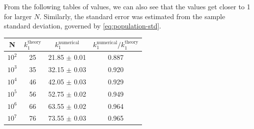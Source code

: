 From the following tables of values, we can also see that the values get closer to 1 for larger $N$. Similarly, the standard error was estimated from the sample standard deviation, governed by \autoref{eq:population-std}. 

\begin{center}
\begin{tabular}{ ||c | c | c | c ||}
\hline
N & $k_1^{\text{theory}}$ & $k_1^{\text{numerical}}$ & $k_1^{\text{numerical}} / k_1^{\text{theory}} $\\ 
\hline
$10^2$ & 25    & 21.85  $\pm$ 0.01 & 0.887 \\  
$10^3$ & 35   & 32.15 $\pm$ 0.03 & 0.920 \\
$10^4$ & 46   & 42.05   $\pm$  0.03  & 0.929 \\
$10^5$ & 56  & 52.75  $\pm$  0.02  & 0.949 \\
$10^6$ & 66  & 63.55  $\pm$  0.02  & 0.964 \\
$10^7$ & 76 & 73.55 $\pm$ 0.03  & 0.965 \\  
\hline
\end{tabular}
\label{table:ra-numerical-theoretical-ratio}
\end{center}